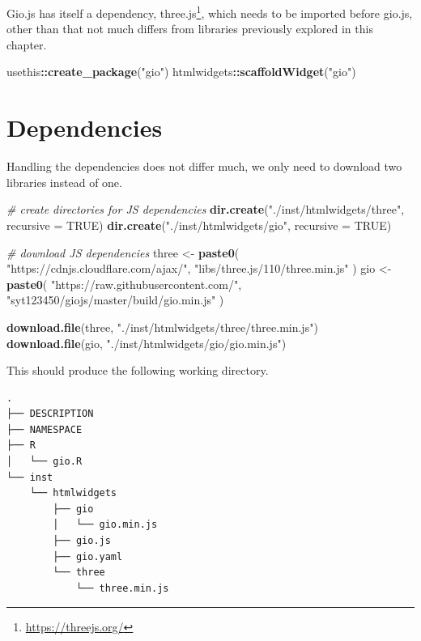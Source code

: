 \documentclass[
]{krantz}
\makeatletter
\newenvironment{Shaded}{\begin{snugshade}}{\end{snugshade}}
\newcommand{\CommentTok}[1]{\textcolor[rgb]{0.37,0.37,0.37}{\textit{#1}}}
\newcommand{\DataTypeTok}[1]{\textcolor[rgb]{0.27,0.27,0.27}{#1}}
\newcommand{\KeywordTok}[1]{\textcolor[rgb]{0.27,0.27,0.27}{\textbf{#1}}}
\newcommand{\NormalTok}[1]{#1}
\newcommand{\OperatorTok}[1]{\textcolor[rgb]{0.43,0.43,0.43}{\textbf{#1}}}
\newcommand{\OtherTok}[1]{\textcolor[rgb]{0.37,0.37,0.37}{#1}}
\newcommand{\StringTok}[1]{\textcolor[rgb]{0.5,0.5,0.5}{#1}}
\renewcommand{\href}[2]{#2\footnote{\url{#1}}}
\newenvironment{kframe}{%
\medskip{}
\setlength{\fboxsep}{.8em}
 \def\at@end@of@kframe{}%
 \ifinner\ifhmode%
  \def\at@end@of@kframe{\end{minipage}}%
  \begin{minipage}{\columnwidth}%
 \fi\fi%
 \def\FrameCommand##1{\hskip\@totalleftmargin \hskip-\fboxsep
 \colorbox{shadecolor}{##1}\hskip-\fboxsep
     \hskip-\linewidth \hskip-\@totalleftmargin \hskip\columnwidth}%
 \MakeFramed {\advance\hsize-\width
   \@totalleftmargin\z@ \linewidth\hsize
   \@setminipage}}%
 {\par\unskip\endMakeFramed%
 \at@end@of@kframe}
\renewenvironment{Shaded}{\begin{kframe}}{\end{kframe}}
\makeatother
\begin{document}
Gio.js has itself a dependency, \href{https://threejs.org/}{three.js}, which needs to be imported before gio.js, other than that not much differs from libraries previously explored in this chapter.

\begin{Shaded}
\begin{Highlighting}[]
\NormalTok{usethis}\OperatorTok{::}\KeywordTok{create\_package}\NormalTok{(}\StringTok{"gio"}\NormalTok{)}
\NormalTok{htmlwidgets}\OperatorTok{::}\KeywordTok{scaffoldWidget}\NormalTok{(}\StringTok{"gio"}\NormalTok{)}
\end{Highlighting}
\end{Shaded}

\hypertarget{dependencies}{%
\section{Dependencies}\label{dependencies}}

Handling the dependencies does not differ much, we only need to download two libraries instead of one.

\begin{Shaded}
\begin{Highlighting}[]
\CommentTok{\# create directories for JS dependencies}
\KeywordTok{dir.create}\NormalTok{(}\StringTok{"./inst/htmlwidgets/three"}\NormalTok{, }\DataTypeTok{recursive =} \OtherTok{TRUE}\NormalTok{)}
\KeywordTok{dir.create}\NormalTok{(}\StringTok{"./inst/htmlwidgets/gio"}\NormalTok{, }\DataTypeTok{recursive =} \OtherTok{TRUE}\NormalTok{)}

\CommentTok{\# download JS dependencies}
\NormalTok{three <{-}}\StringTok{ }\KeywordTok{paste0}\NormalTok{(}
  \StringTok{"https://cdnjs.cloudflare.com/ajax/"}\NormalTok{,}
  \StringTok{"libs/three.js/110/three.min.js"}
\NormalTok{)}
\NormalTok{gio <{-}}\StringTok{ }\KeywordTok{paste0}\NormalTok{(}
  \StringTok{"https://raw.githubusercontent.com/"}\NormalTok{,}
  \StringTok{"syt123450/giojs/master/build/gio.min.js"}
\NormalTok{)}

\KeywordTok{download.file}\NormalTok{(three, }\StringTok{"./inst/htmlwidgets/three/three.min.js"}\NormalTok{)}
\KeywordTok{download.file}\NormalTok{(gio, }\StringTok{"./inst/htmlwidgets/gio/gio.min.js"}\NormalTok{)}
\end{Highlighting}
\end{Shaded}

This should produce the following working directory.

\begin{verbatim}
.
├── DESCRIPTION
├── NAMESPACE
├── R
│   └── gio.R
└── inst
    └── htmlwidgets
        ├── gio
        │   └── gio.min.js
        ├── gio.js
        ├── gio.yaml
        └── three
            └── three.min.js
\end{verbatim}
\end{document}
